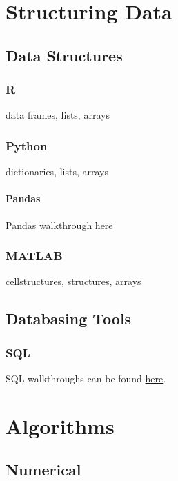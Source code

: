 \documentclass[]{article}
\begin{document}
\part{Structuring Data}

\chapter{Data Structures}

\section{R}

data frames, lists, arrays

\section{Python}

dictionaries, lists, arrays

\subsection{Pandas}

Pandas walkthrough
\href{http://pandas.pydata.org/pandas-docs/stable/getting_started/10min.html}{\color{blue}here}

\section{MATLAB}

cellstructures, structures, arrays

\chapter{Databasing Tools}

\section{SQL}

SQL walkthroughs can be found
\href{https://blog.thedataincubator.com/2015/01/processing-data-like-a-professional-data-scientist/}{\color{blue}here}.

\part{Algorithms}

\chapter{Numerical}
\end{document}
